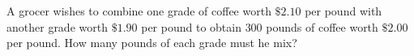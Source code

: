 A grocer wishes to combine one grade of coffee worth $\$2.10$ per pound with another grade worth $\$1.90$ per pound to obtain $300$ pounds of coffee worth $\$2.00$ per pound. How many pounds of each grade must he mix?
